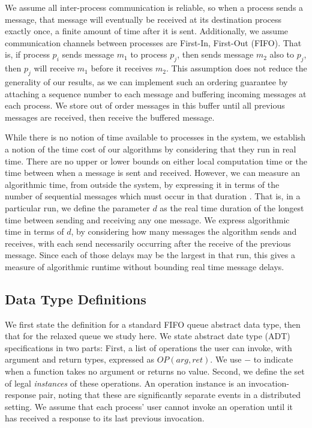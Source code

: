 \documentclass[a4paper,anonymous,USenglish]{lipics-v2021}
\theoremstyle{definition}
\begin{document}
We assume all inter-process communication is reliable, so when a process sends a message, that message will eventually be received at its destination process exactly once, a finite amount of time after it is sent.  Additionally, we assume communication channels between processes are First-In, First-Out (FIFO).  That is, if process $p_i$ sends message $m_1$ to process $p_j$, then sends message $m_2$ also to $p_j$, then $p_j$ will receive $m_1$ before it receives $m_2$.  This assumption does not reduce the generality of our results, as we can implement such an ordering guarantee by attaching a sequence number to each message and buffering incoming messages at each process.  We store out of order messages in this buffer until all previous messages are received, then receive the buffered message.

While there is no notion of time available to processes in the system, we establish a notion of the time cost of our algorithms by considering that they run in real time.  There are no upper or lower bounds on either local computation time or the time between when a message is sent and received.  However, we can measure an algorithmic time, from outside the system, by expressing it in terms of the number of sequential messages which must occur in that duration \cite{AttiyaWelch04}.  That is, in a particular run, we define the parameter $d$ as the real time duration of the longest time between sending and receiving any one message.  We express algorithmic time in terms of $d$, by considering how many messages the algorithm sends and receives, with each send necessarily occurring after the receive of the previous message.  Since each of those delays may be the largest in that run, this gives a measure of algorithmic runtime without bounding real time message delays.  

\subsection{Data Type Definitions}

We first state the definition for a standard FIFO queue abstract data type, then that for the relaxed queue we study here.  We state abstract date type (ADT) specifications in two parts: First, a list of operations the user can invoke, with argument and return types, expressed as $OP(arg,ret)$.  We use $-$ to indicate when a function takes no argument or returns no value.  Second, we define the set of legal \emph{instances} of these operations.  An operation instance is an invocation-response pair, noting that these are significantly separate events in a distributed setting.  We assume that each process' user cannot invoke an operation until it has received a response to its last previous invocation.   
\end{document}
